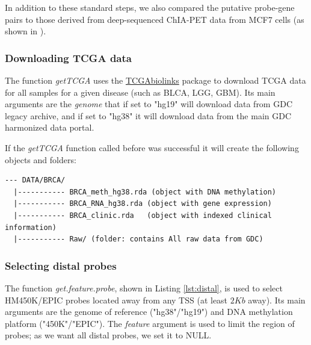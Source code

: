 In addition to these standard steps, we also compared the
putative probe-gene pairs to those derived from deep-sequenced ChIA-PET
data from MCF7 cells (as shown in \cite{yao2015inferring}).

\subsubsection*{Downloading TCGA data}

The function \textit{getTCGA} uses the   \href{http://bioconductor.org/packages/TCGAbiolinks/}{TCGAbiolinks}
package \cite{colaprico2015tcgabiolinks} to download TCGA data for all samples
for a given disease (such as BLCA, LGG, GBM). Its main arguments are
the \textit{genome}  that if set to "hg19" will download data from GDC legacy archive, and if set
to "hg38" it will download data from the main GDC harmonized data portal.



If the \textit{getTCGA} function called before was successful it will
 create the following objects and folders:
\begin{verbatim}
--- DATA/BRCA/
  |----------- BRCA_meth_hg38.rda (object with DNA methylation)
  |----------- BRCA_RNA_hg38.rda (object with gene expression)
  |----------- BRCA_clinic.rda   (object with indexed clinical information)
  |----------- Raw/ (folder: contains All raw data from GDC)
\end{verbatim}

\subsubsection*{Selecting distal probes}

The function \textit{get.feature.probe}, shown in Listing \ref{lst:distal},
is used to select HM450K/EPIC probes located away from any TSS (at least $2Kb$ away).
Its main arguments are the genome of reference ("hg38"/"hg19") and DNA methylation
platform ("450K"/"EPIC"). The \textit{feature} argument is used to limit the region of probes; as we want all distal probes, we set it to NULL.


